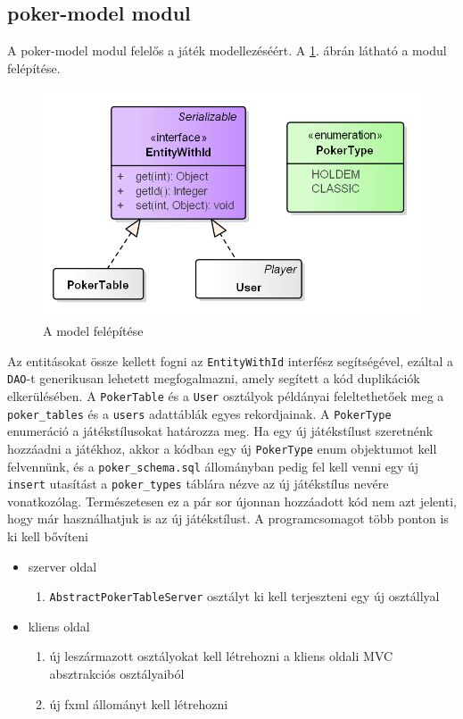\subsection{poker-model modul} \label{sec:poker-model}
A poker-model modul felelős a játék modellezéséért. A \ref{fig:model}. ábrán látható a modul felépítése. 
\begin{figure}[h!]
	\caption{A model felépítése}
	\label{fig:model}
	\centering
	\includegraphics[width=12cm]{developer-documentation/images/model.png}
\end{figure}
Az entitásokat össze kellett fogni az \texttt{EntityWithId} interfész segítségével, ezáltal a \texttt{DAO}-t generikusan lehetett megfogalmazni, amely segített a kód duplikációk elkerülésében. A \texttt{PokerTable} és a \texttt{User} osztályok példányai feleltethetőek meg a \texttt{poker\_tables} és a \texttt{users} adattáblák egyes rekordjainak. A \texttt{PokerType} enumeráció a játékstílusokat határozza meg. Ha egy új játékstílust szeretnénk hozzáadni a játékhoz, akkor a kódban egy új \texttt{PokerType} enum objektumot kell felvennünk, és a \texttt{poker\_schema.sql} állományban pedig fel kell venni egy új \texttt{insert} utasítást a \texttt{poker\_types} táblára nézve az új játékstílus nevére vonatkozólag. Természetesen ez a pár sor újonnan hozzáadott kód nem azt jelenti, hogy már használhatjuk is az új játékstílust. A programcsomagot több ponton is ki kell bővíteni
\begin{itemize}[leftmargin=2cm]
	\item szerver oldal
		\begin{enumerate}
			\item \texttt{AbstractPokerTableServer} osztályt ki kell terjeszteni egy új osztállyal
		\end{enumerate}
	\item kliens oldal
		\begin{enumerate}
			\item új leszármazott osztályokat kell létrehozni a kliens oldali MVC absztrakciós osztályaiból
			\item új fxml állományt kell létrehozni
		\end{enumerate}
\end{itemize}

